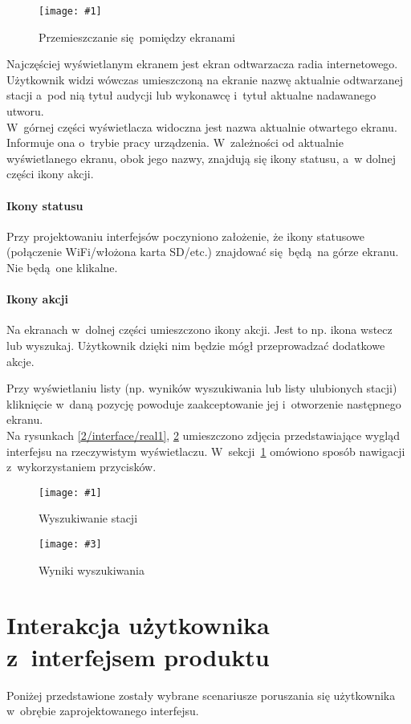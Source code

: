 \documentclass[polish]{aghengthesis}
\newcommand{\imgint}[4]{
	\begin{figure}[{#4}]
		\centering
		\texttt{[image: \#1]}
		\caption{#2}
		\label{#1}
	\end{figure}
}
\newcommand{\imgh}[3]{\imgint{#1}{#2}{#3}{H}}
\newcommand{\imgintss}[5]{
	\begin{figure}[{#5}]
		\centering
		\begin{minipage}{.45\textwidth}
			\centering
			\texttt{[image: \#1]}
			\caption{#2}
			\label{#1}
		\end{minipage}%
		\hfill
		\begin{minipage}{.45\textwidth}
			\centering
			\texttt{[image: \#3]}
			\caption{#4}
			\label{#3}
		\end{minipage}
	\end{figure}
}
\newcommand{\imghss}[4]{\imgintss{#1}{#2}{#3}{#4}{H}}
\begin{document}
		\imgh{2/interface/PicoRadio-flow}{Przemieszczanie się pomiędzy ekranami}{0.9}
		
		Najczęściej wyświetlanym ekranem jest ekran odtwarzacza radia internetowego. Użytkownik widzi wówczas umieszczoną na ekranie nazwę aktualnie odtwarzanej stacji a~pod nią tytuł audycji lub wykonawcę i~tytuł aktualne nadawanego utworu.
		$ $\\
		
		W~górnej części wyświetlacza widoczna jest nazwa aktualnie otwartego ekranu. Informuje ona o~trybie pracy urządzenia.
		W~zależności od aktualnie wyświetlanego ekranu, obok jego nazwy, znajdują się ikony statusu, a~w dolnej części ikony akcji.
		
		\paragraph{Ikony statusu}
			Przy projektowaniu interfejsów poczyniono założenie, że ikony statusowe (połączenie WiFi/włożona karta SD/etc.) znajdować się będą na górze ekranu. Nie będą one klikalne.
			
		\paragraph{Ikony akcji}
			Na ekranach w~dolnej części umieszczono ikony akcji. Jest to np. ikona wstecz lub wyszukaj. Użytkownik dzięki nim będzie mógł przeprowadzać dodatkowe akcje.
		
		$ $\\
		Przy wyświetlaniu listy (np. wyników wyszukiwania lub listy ulubionych stacji) kliknięcie w~daną pozycję powoduje zaakceptowanie jej i~otworzenie następnego ekranu.
		$ $\\
		
		Na rysunkach \ref{2/interface/real1}, \ref{2/interface/real2} umieszczono zdjęcia przedstawiające wygląd interfejsu na rzeczywistym wyświetlaczu. W~sekcji~\ref{sec:uinav} omówiono sposób nawigacji z~wykorzystaniem przycisków.
		\imghss{2/interface/real1}{Wyszukiwanie stacji}{2/interface/real2}{Wyniki wyszukiwania}
	
	\section{Interakcja użytkownika z~interfejsem produktu}
		\label{sec:uinav}
		Poniżej przedstawione zostały wybrane scenariusze poruszania się użytkownika w~obrębie zaprojektowanego interfejsu.
		$ $\\
		
\end{document}
